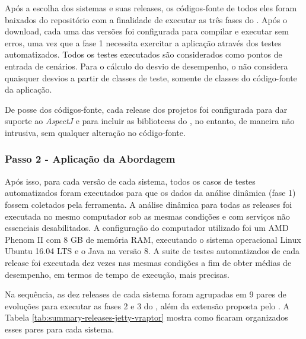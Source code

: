 Após a escolha dos sistemas e suas releases, os códigos-fonte de todos eles foram baixados do repositório com a finalidade de executar as três fases do \textit{\perfMinerName}. Após o download, cada uma das versões foi configurada para compilar e executar sem erros, uma vez que a fase 1 necessita exercitar a aplicação através dos testes automatizados. Todos os testes executados são considerados como pontos de entrada de cenários. Para o cálculo do desvio de desempenho, o \textit{\perfMinerName} não considera quaisquer desvios a partir de classes de teste, somente de classes do código-fonte da aplicação.

De posse dos códigos-fonte, cada release dos projetos foi configurada para dar suporte ao \textit{AspectJ} e para incluir as bibliotecas do \textit{\perfMinerName}, no entanto, de maneira não intrusiva, sem qualquer alteração no código-fonte.

\subsubsection{Passo 2 - Aplicação da Abordagem} \label{subsec:avaliacao-procedimentos-passo-2}

Após isso, para cada versão de cada sistema, todos os casos de testes automatizados foram executados para que os dados da análise dinâmica (fase 1) fossem coletados pela ferramenta. A análise dinâmica para todas as releases foi executada no mesmo computador sob as mesmas condições e com serviços não essenciais desabilitados. A configuração do computador utilizado foi um AMD Phenom II com 8 GB de memória RAM, executando o sistema operacional Linux Ubuntu 16.04 LTS e o Java na versão 8. A suite de testes automatizados de cada release foi executada dez vezes nas mesmas condições a fim de obter médias de desempenho, em termos de tempo de execução, mais precisas.

Na sequência, as dez releases de cada sistema foram agrupadas em 9 pares de evoluções para executar as fases 2 e 3 do \textit{\perfMinerName}, além da extensão proposta pelo \textit{\toolName}. A Tabela \ref{tab:summary-releases-jetty-vraptor} mostra como ficaram organizados esses pares para cada sistema.

